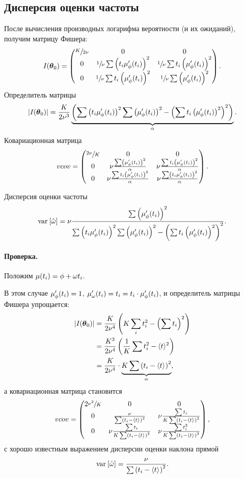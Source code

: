 \subsection{Дисперсия оценки частоты}
После вычисления производных логарифма вероятности (и их ожиданий), получим матрицу Фишера: 
\[
\Fisher = \begin{pmatrix}
\sfrac{K}{2\nu} & 0 								& 0 \\
0 				& \sfrac1\nu\sum\bkt{t_i\mupp}^2	& \sfrac1\nu\sum t_i\bkt{\mupp}^2 \\
0				& \sfrac1\nu\sum t_i\bkt{\mupp}^2	&\sfrac1\nu\sum\bkt{\mupp}^2
\end{pmatrix}.
\]
Определитель матрицы
\newcommand{\STM}{\alpha}
\[
|\Fisher| = \frac{K}{2\nu^3}\underbrace{\bkt{\sum\bkt{t_i\mupp}^2\sum\bkt{\mupp}^2 - \bkt{\sum t_i\bkt{\mupp}^2}^2}}_{\STM}.
\]
Ковариационная матрица
\[
vcov = \begin{pmatrix}
\sfrac{2\nu}{K}& 0									& 0				\\
0				&\nu\frac{\sum\bkt{\mupp}^2}{\STM}		&\nu\frac{\sum t_i\bkt{\mupp}^2}{\STM}\\
0				&\nu\frac{\sum t_i\bkt{\mupp}^2}{\STM}	&\nu\frac{\sum\bkt{t_i\mupp}^2}{\STM}
\end{pmatrix}.
\]

Дисперсия оценки частоты
\begin{equation}\label{eq:Var1}
\var{\hat{\w}} = \nu\frac{\sum\bkt{\mupp}^2}{\sum\bkt{t_i\mupp}^2\sum\bkt{\mupp}^2 - \bkt{\sum t_i\bkt{\mupp}^2}^2}.
\end{equation}

\paragraph{Проверка.} Положим ${\mu(t_i) = \phi + \omega t_i}$. 

В этом случае ${\mupp = 1}$, 
${\mu'_\w(t_i) = t_i = t_i\cdot\mupp}$, и определитель матрицы Фишера упрощается:
\begin{align*}
|\Fisher| &= \frac{K}{2\nu^4}\bkt{K\sum_i t_i^2 - \bkt{\sum t_i}^2} \\
&= \frac{K^3}{2\nu^4}\bkt{\frac1K\sum t_i^2 - \avg{t}^2} \\
&= \frac{K}{2\nu^4}\cdot\underbrace{K\sum\bkt{t_i - \avg{t}}^2}_{\STM},
\end{align*}
\newcommand{\SSX}{\sum\bkt{t_i - \avg{t}}^2}
а ковариационная матрица становится
\[
vcov = \begin{pmatrix}
2\sfrac{\nu^2}{K}& 0									& 0				\\
0				&\frac{\nu}{\SSX}		&\nu\frac{\sum t_i}{K\SSX}\\
0				&\nu\frac{\sum t_i}{K\SSX}	&\nu\frac{\sum t_i^2}{K\SSX}
\end{pmatrix},
\]
с хорошо известным выражением дисперсии оценки наклона прямой
\[
\var{\hat\w} = \frac{\nu}{\SSX}.
\]


